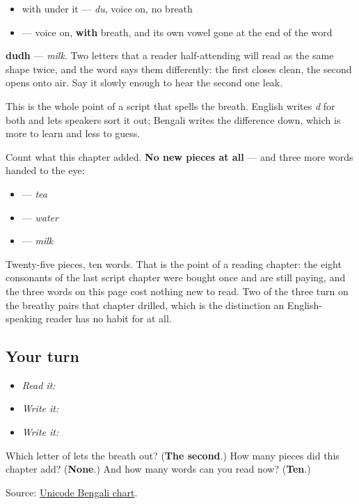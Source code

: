 \begin{itemize}
\raggedright
  \item \textbf{} with \textbf{} under it — \emph{du}, voice on, no breath
  \item \textbf{} — voice on, \textbf{with} breath, and its own vowel gone at the end of the word
\end{itemize}

\textbf{dudh} — \emph{milk}. Two letters that a reader half-attending will read as the same shape twice, and the word says them differently: the first closes clean, the second opens onto air. Say it slowly enough to hear the second one leak.

This is the whole point of a script that spells the breath. English writes \emph{d} for both and lets speakers sort it out; Bengali writes the difference down, which is more to learn and less to guess.

Count what this chapter added. \textbf{No new pieces at all} — and three more words handed to the eye:

\begin{itemize}
\raggedright
  \item \textbf{} — \emph{tea}
  \item \textbf{} — \emph{water}
  \item \textbf{} — \emph{milk}
\end{itemize}

Twenty-five pieces, ten words. That is the point of a reading chapter: the eight consonants of the last script chapter were bought once and are still paying, and the three words on this page cost nothing new to read. Two of the three turn on the breathy pairs that chapter drilled, which is the distinction an English-speaking reader has no habit for at all.

\subsection*{Your turn}
\begin{itemize}
\raggedright
  \item \emph{Read it:}   
  \item \emph{Write it:} 
  \item \emph{Write it:}   
\end{itemize}

\begin{tcolorbox}[breakable,colback=teal!4,colframe=teal!35!black,title={Before you move on}]
Which letter of \textbf{} lets the breath out? (\textbf{The second}.) How many pieces did this chapter add? (\textbf{None}.) And how many words can you read now? (\textbf{Ten}.)

Source: \href{https://www.unicode.org/charts/PDF/U0980.pdf}{Unicode Bengali chart}.
\end{tcolorbox}
